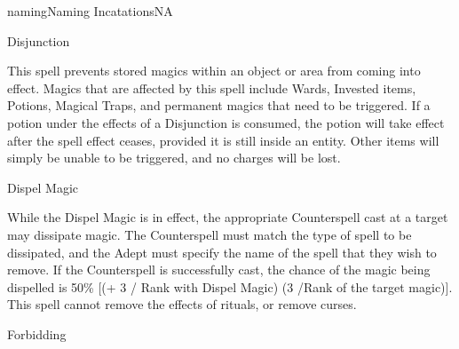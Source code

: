 \begin{College}[2.0]{naming}{Naming Incatations}{NA}
\begin{spell}[S-4]{Disjunction}

\begin{effects}
This spell prevents stored magics within an object or area from coming
into effect. Magics that are affected by this spell include Wards,
Invested items, Potions, Magical Traps, and permanent magics that need
to be triggered.  If a potion under the effects of a Disjunction is
consumed, the potion will take effect after the spell effect ceases,
provided it is still inside an entity.  Other items will simply be
unable to be triggered, and no charges will be lost.
\end{effects}
\end{spell}

\begin{spell}[S-5]{Dispel Magic}

\begin{effects}
While the Dispel Magic is in effect, the appropriate Counterspell cast
at a target may dissipate magic. The Counterspell must match the type
of spell to be dissipated, and the Adept must specify the name of the
spell that they wish to remove.  If the Counterspell is successfully
cast, the chance of the magic being dispelled is 50\% [(+ 3 / Rank
  with Dispel Magic) (3 /Rank of the target magic)].  This spell
cannot remove the effects of rituals, or remove curses.

\end{effects}
\end{spell}

\begin{spell}[S-6]{Forbidding}


\end{spell}
\end{College}
